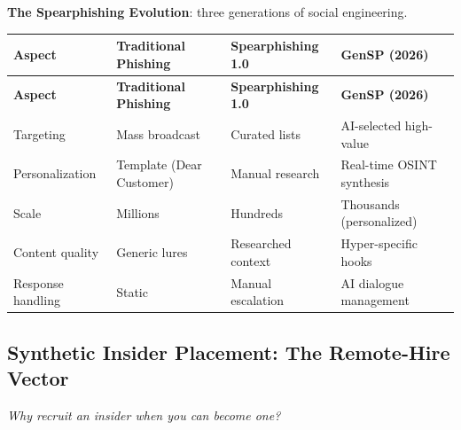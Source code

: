 \documentclass[11pt,letterpaper]{article}
\newcommand{\etraneed}[1]{\par\ifdim\pagegoal<\maxdimen\ifdim\pagetotal<\pagegoal\ifdim\dimexpr\pagegoal-\pagetotal\relax<\dimexpr#1\relax\newpage\fi\fi\fi}
\begin{document}
\etraneed{12\baselineskip}
\textbf{The Spearphishing Evolution}: three generations of social engineering.

{\small
\begin{longtable}{L{2.5cm}L{3.5cm}L{3.5cm}L{3cm}}
\toprule
\textbf{Aspect} & \textbf{Traditional Phishing} & \textbf{Spearphishing 1.0} & \textbf{GenSP (2026)} \\
\midrule
\endfirsthead
\toprule
\textbf{Aspect} & \textbf{Traditional Phishing} & \textbf{Spearphishing 1.0} & \textbf{GenSP (2026)} \\
\midrule
\endhead
Targeting & Mass broadcast & Curated lists & AI-selected high-value \\*
Personalization & Template (Dear Customer) & Manual research & Real-time OSINT synthesis \\
Scale & Millions & Hundreds & Thousands (personalized) \\
Content quality & Generic lures & Researched context & Hyper-specific hooks \\*
Response handling & Static & Manual escalation & AI dialogue management \\
\bottomrule
\end{longtable}}

\subsection{Synthetic Insider Placement: The Remote-Hire Vector}

\textit{Why recruit an insider when you can become one?}
\end{document}
